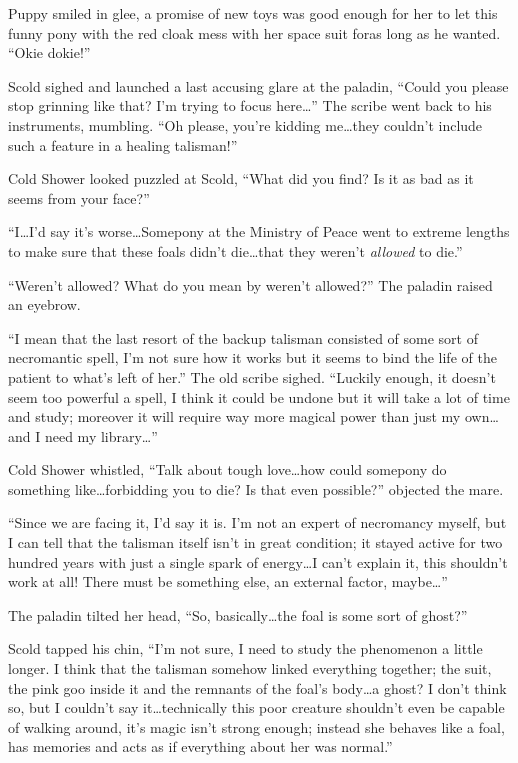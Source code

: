 Puppy smiled in glee, a promise of new toys was good enough for her to let this funny pony with the red cloak mess with her space suit foras long as he wanted. ``Okie dokie!''

Scold sighed and launched a last accusing glare at the paladin, ``Could you please stop grinning like that? I'm trying to focus here\dots'' The scribe went back to his instruments, mumbling. ``Oh please, you're kidding me\dots they couldn't include such a feature in a healing talisman!''

Cold Shower looked puzzled at Scold, ``What did you find? Is it as bad as it seems from your face?''

``I\dots I'd say it's worse\dots Somepony at the Ministry of Peace went to extreme lengths to make sure that these foals didn't die\dots that they weren't \emph{allowed} to die.''

``Weren't allowed? What do you mean by weren't allowed?'' The paladin raised an eyebrow.

``I mean that the last resort of the backup talisman consisted of some sort of necromantic spell, I'm not sure how it works but it seems to bind the life of the patient to what's left of her.'' The old scribe sighed. ``Luckily enough, it doesn't seem too powerful a spell, I think it could be undone but it will take a lot of time and study; moreover it will require way more magical power than just my own\dots and I need my library\dots''

Cold Shower whistled, ``Talk about tough love\dots how could somepony do something like\dots forbidding you to die? Is that even possible?'' objected the mare.

``Since we are facing it, I'd say it is. I'm not an expert of necromancy myself, but I can tell that the talisman itself isn't in great condition; it stayed active for two hundred years with just a single spark of energy\dots I can't explain it, this shouldn't work at all! There must be something else, an external factor, maybe\dots''

The paladin tilted her head, ``So, basically\dots the foal is some sort of ghost?''

Scold tapped his chin, ``I'm not sure, I need to study the phenomenon a little longer. I think that the talisman somehow linked everything together; the suit, the pink goo inside it and the remnants of the foal's body\dots a ghost? I don't think so, but I couldn't say it\dots technically this poor creature shouldn't even be capable of walking around, it's magic isn't strong enough; instead she behaves like a foal, has memories and acts as if everything about her was normal.''

